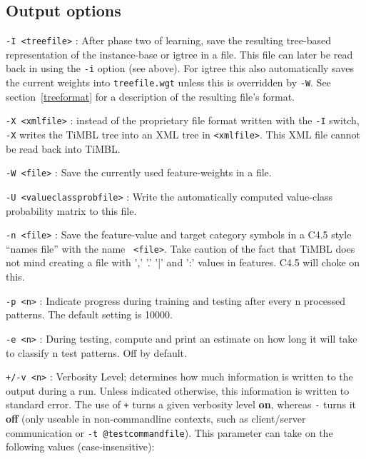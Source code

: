\documentclass{report}
\begin{document}
\subsection{Output options}

\begin{description}

\item {\tt -I <treefile>} : After phase two of learning, save
  the resulting tree-based representation of the instance-base or {\sc
    igtree} in a file. This file can later be read back in using the
  {\tt -i} option (see above). For {\sc igtree} this also automatically
  saves the current weights into {\tt treefile.wgt} unless this is
  overridden by {\tt -W}.
  See section~\ref{treeformat} for a description of the resulting file's format.

\item {\tt -X <xmlfile>} : instead of the proprietary file format
  written with the {\tt -I} switch, {\tt -X} writes the TiMBL tree
  into an XML tree in {\tt <xmlfile>}. This XML file cannot be read
  back into TiMBL.

\item {\tt -W <file>} : Save the currently used feature-weights in a
file.

\item {\tt -U <valueclassprobfile>} : Write the automatically computed
value-class probability matrix to this file.

\item {\tt -n <file>} : Save the feature-value and target category
symbols in a C4.5 style ``names file'' with the name {\tt
<file>}. Take caution of the fact that TiMBL does not mind creating a
file with ',' '.' '|' and ':' values in features. C4.5 will choke on this.

\item {\tt -p <n>} : Indicate progress during training and testing
after every n processed patterns. The default setting is 10000.

\item {\tt -e <n>} : During testing, compute and print an estimate on
how long it will take to classify n test patterns. Off by
default.

\item {\tt +/-v <n>} : Verbosity Level; determines how much
information is written to the output during a run. Unless indicated
otherwise, this information is written to standard error. The use of
{\tt +} turns a given verbosity level {\bf on}, whereas {\tt -} turns
it {\bf off} (only useable in non-commandline contexts, such as
client/server communication or {\tt -t @testcommandfile}). This
parameter can take on the following values (case-insensitive):


\end{description}
\end{document}
